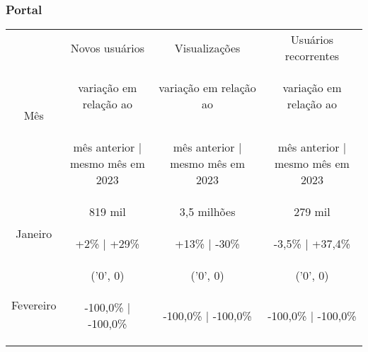 \documentclass{article}%
\begin{document}
\subsubsection*{Portal}%
\label{ssubsec:Portal}%
\begin{minipage}{\textwidth}%
\centering%
\begin{tabular}{@{}|c|c|c|c|@{}}%
\toprule%
\multirow{3}{*}{Mês}&Novos usuários&Visualizações&Usuários recorrentes\\%
&\begin{footnotesize}%
variação em relação ao%
\end{footnotesize}&\begin{footnotesize}%
variação em relação ao%
\end{footnotesize}&\begin{footnotesize}%
variação em relação ao%
\end{footnotesize}\\%
&\begin{footnotesize}%
mês anterior | mesmo mês em 2023%
\end{footnotesize}&\begin{footnotesize}%
mês anterior | mesmo mês em 2023%
\end{footnotesize}&\begin{footnotesize}%
mês anterior | mesmo mês em 2023%
\end{footnotesize}\\%
\midrule%
\multirow{2}{*}{Janeiro}&819 mil&3,5 milhões&279 mil\\%
&\begin{footnotesize}%
+2\% | +29\%%
\end{footnotesize}&\begin{footnotesize}%
+13\% | {-}30\%%
\end{footnotesize}&\begin{footnotesize}%
{-}3,5\% | +37,4\%%
\end{footnotesize}\\%
\midrule%
\multirow{2}{*}{Fevereiro}&('0', 0) &('0', 0) &('0', 0) \\%
&\begin{footnotesize}%
{-}100,0\% | {-}100,0\%%
\end{footnotesize}&\begin{footnotesize}%
{-}100,0\% | {-}100,0\%%
\end{footnotesize}&\begin{footnotesize}%
{-}100,0\% | {-}100,0\%%
\end{footnotesize}\\\bottomrule%
%
\end{tabular}%
\end{minipage}
\end{document}
